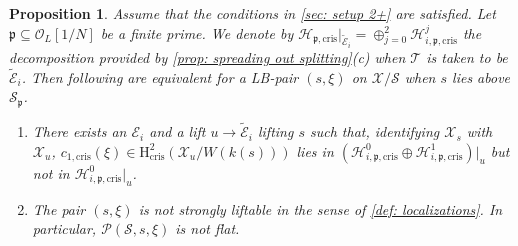 \documentclass[letter, 11pt]{article}
\theoremstyle{plain}
\newtheorem{proposition}[subsubsection]{Proposition}
\theoremstyle{definition}
\newcommand{\<}{\langle}
\renewcommand{\>}{\rangle}
\def\wt{\widetilde}
\newcommand{\fp}{\mathfrak{p}}
\newcommand{\sH}{\mathcal{H}}
\newcommand{\sX}{\mathcal{X}}
\newcommand{\sS}{\mathcal{S}}
\newcommand{\sT}{\mathcal{T}}
\newcommand{\sE}{\mathcal{E}}
\newcommand{\sO}{\mathcal{O}}
\renewcommand{\H}{\mathrm{H}}
\newcommand{\shP}{\mathscr{P}}
\newcommand{\cris}{\mathrm{cris}}
\begin{document}
\begin{proposition}
\label{prop: only non-liftable situation} Assume that the conditions in \ref{sec: setup 2+} are satisfied. Let $\fp \subseteq \sO_L[1/N]$ be a finite prime. We denote by $\sH_{\fp, \cris}|_{\wt{\sE}_i} = \oplus_{j = 0}^2 \sH^j_{i, \fp, \cris}$ the decomposition provided by \ref{prop: spreading out splitting}(c) when $\sT$ is taken to be $\wt{\sE}_i$. Then following are equivalent for a LB-pair $(s, \xi)$ on $\sX/\sS$ when $s$ lies above $\sS_\fp$. 
    \begin{enumerate}[label=\upshape{(\roman*)}]
        \item There exists an $\sE_i$ and a lift $u \to \wt{\sE}_i$ lifting $s$ such that, identifying $\sX_s$ with $\sX_u$, $c_{1, \cris}(\xi) \in \H^2_\cris(\sX_u/W(k(s)))$ lies in $(\sH^0_{i, \fp, \cris} \oplus \sH^1_{i, \fp, \cris})|_u$ but not in $\sH^0_{i, \fp, \cris}|_u$. 
        \item The pair $(s, \xi)$ is not strongly liftable in the sense of \ref{def: localizations}. In particular, $\shP(\sS, s, \xi)$ is not flat. 
    \end{enumerate}
\end{proposition}
\end{document}
